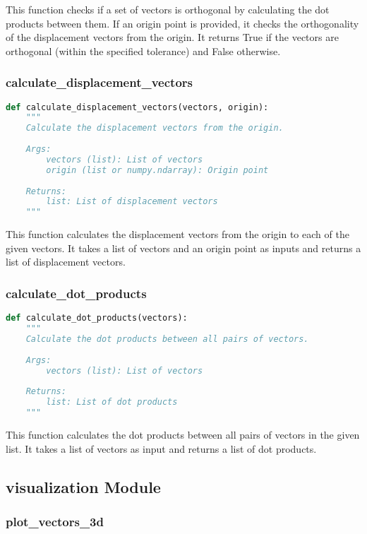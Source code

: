 This function checks if a set of vectors is orthogonal by calculating the dot products between them. If an origin point is provided, it checks the orthogonality of the displacement vectors from the origin. It returns True if the vectors are orthogonal (within the specified tolerance) and False otherwise.

\subsubsection{calculate\_displacement\_vectors}

\begin{lstlisting}[language=Python]
def calculate_displacement_vectors(vectors, origin):
    """
    Calculate the displacement vectors from the origin.
    
    Args:
        vectors (list): List of vectors
        origin (list or numpy.ndarray): Origin point
        
    Returns:
        list: List of displacement vectors
    """
\end{lstlisting}

This function calculates the displacement vectors from the origin to each of the given vectors. It takes a list of vectors and an origin point as inputs and returns a list of displacement vectors.

\subsubsection{calculate\_dot\_products}

\begin{lstlisting}[language=Python]
def calculate_dot_products(vectors):
    """
    Calculate the dot products between all pairs of vectors.
    
    Args:
        vectors (list): List of vectors
        
    Returns:
        list: List of dot products
    """
\end{lstlisting}

This function calculates the dot products between all pairs of vectors in the given list. It takes a list of vectors as input and returns a list of dot products.

\subsection{visualization Module}

\subsubsection{plot\_vectors\_3d}

